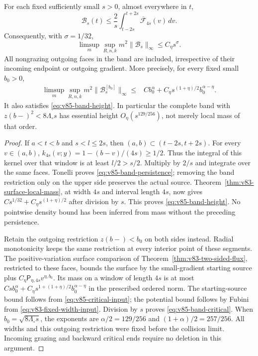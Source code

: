 \begin{theorem}
\label{thm:v85-band-height}
For each fixed sufficiently small $s>0$, almost everywhere in $t$,
\begin{equation}\label{eq:v85-band-persistence}
 \mathcal B_s(t)\le\frac2s\int_{t-2s}^{t+2s}
                                     \overline{\mathcal F}_{4s}(v)\,dv.
\end{equation}
Consequently, with $\sigma=1/32$,
\begin{equation}\label{eq:v85-band-height}
 \limsup_m\sup_{R,n,k}m^2\|\mathcal B_s\|_\infty
                                                   \le C_\eta s^\sigma.
\end{equation}
All nongrazing outgoing faces in the band are included, irrespective
of their incoming endpoint or outgoing gradient. More precisely,
for every fixed small $b_0>0$,
\begin{align}
 \limsup_m\sup_{R,n,k}m^2\|\mathcal B_s^{[b_0]}\|_\infty
 \le{}& Cb_0^\alpha
       +C_\eta s^{(1+\eta)/2}b_0^{\alpha-\eta}.
                                             \label{eq:v85-band-critical}
\end{align}
It also satisfies \eqref{eq:v85-band-height}. In particular the
complete band with $z(b-)^2<8\Lambda_\circ s$ has essential height
$O_\eta(s^{129/256})$, not merely local mass of that order.
\end{theorem}
\begin{proof}
If $a<t<b$ and $s<l\le2s$, then $(a,b)\subset(t-2s,t+2s)$.
For every $v\in(a,b)$,
$k_{4s}(v;y)=1-(b-v)/(4s)\ge1/2$.
Thus the integral of this kernel over that window is at least
$l/2>s/2$. Multiply by $2/s$ and integrate over the same faces.
Tonelli proves \eqref{eq:v85-band-persistence}; removing the band
restriction only on the upper side preserves the actual source.
Theorem~\ref{thm:v83-surface-local-mass}, at width $4s$ and interval
length $4s$, now gives
$C s^{1/32}+C_\eta s^{(1+\eta)/2}$ after division by $s$.
This proves \eqref{eq:v85-band-height}. No pointwise density bound
has been inferred from mass without the preceding persistence.

Retain the outgoing restriction $z(b-)<b_0$ on both sides instead.
Radial monotonicity keeps the same restriction at every interior
point of these segments. The positive-variation surface comparison
of Theorem~\ref{thm:v83-two-sided-flux}, restricted to these faces,
bounds the surface by the small-gradient starting source plus
$C_\eta\mathsf P_{\eta,4s}v^{\eta,b_0}$. Its mass on a window
of length $4s$ is at most
$Cs b_0^\alpha+C_\eta s^{1+(1+\eta)/2}b_0^{\alpha-\eta}$
in the prescribed ordered norm. The starting-source bound follows
from \eqref{eq:v85-critical-input}; the potential bound follows by
Fubini from \eqref{eq:v83-fixed-width-input}. Division by $s$ proves
\eqref{eq:v85-band-critical}. When $b_0=\sqrt{8\Lambda_\circ s}$,
the exponents are $\alpha/2=129/256$ and $(1+\alpha)/2=257/256$.
All widths and this outgoing restriction were fixed before the
collision limit. Incoming grazing and backward critical ends require
no deletion in this argument.
\end{proof}

